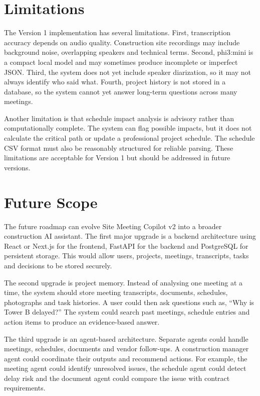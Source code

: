 \documentclass[11pt,a4paper]{article}
\begin{document}
\section{Limitations}

The Version 1 implementation has several limitations. First, transcription accuracy depends on audio quality. Construction site recordings may include background noise, overlapping speakers and technical terms. Second, phi3:mini is a compact local model and may sometimes produce incomplete or imperfect JSON. Third, the system does not yet include speaker diarization, so it may not always identify who said what. Fourth, project history is not stored in a database, so the system cannot yet answer long-term questions across many meetings.

Another limitation is that schedule impact analysis is advisory rather than computationally complete. The system can flag possible impacts, but it does not calculate the critical path or update a professional project schedule. The schedule CSV format must also be reasonably structured for reliable parsing. These limitations are acceptable for Version 1 but should be addressed in future versions.

\section{Future Scope}

The future roadmap can evolve Site Meeting Copilot v2 into a broader construction AI assistant. The first major upgrade is a backend architecture using React or Next.js for the frontend, FastAPI for the backend and PostgreSQL for persistent storage. This would allow users, projects, meetings, transcripts, tasks and decisions to be stored securely.

The second upgrade is project memory. Instead of analysing one meeting at a time, the system should store meeting transcripts, documents, schedules, photographs and task histories. A user could then ask questions such as, ``Why is Tower B delayed?'' The system could search past meetings, schedule entries and action items to produce an evidence-based answer.

The third upgrade is an agent-based architecture. Separate agents could handle meetings, schedules, documents and vendor follow-ups. A construction manager agent could coordinate their outputs and recommend actions. For example, the meeting agent could identify unresolved issues, the schedule agent could detect delay risk and the document agent could compare the issue with contract requirements.
\end{document}

